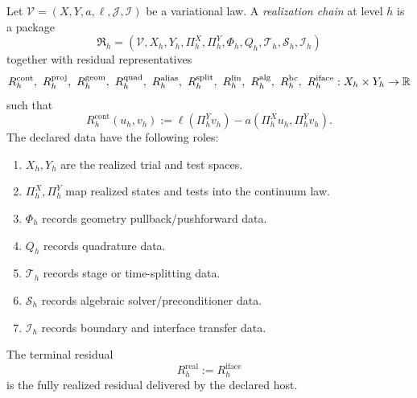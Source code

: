 \begin{definition}
\label{def:realization-chain}
Let \(\mathcal V=(X,Y,a,\ell,\mathcal J,\mathcal I)\) be a variational law. A
\emph{realization chain} at level \(h\) is a package
\[
\mathfrak R_h
=
(\mathcal V,X_h,Y_h,\Pi_h^X,\Pi_h^Y,\Phi_h,Q_h,\mathcal T_h,\mathcal S_h,\mathcal I_h)
\]
together with residual representatives
\[
R_h^{\mathrm{cont}},
\ R_h^{\mathrm{proj}},
\ R_h^{\mathrm{geom}},
\ R_h^{\mathrm{quad}},
\ R_h^{\mathrm{alias}},
\ R_h^{\mathrm{split}},
\ R_h^{\mathrm{lin}},
\ R_h^{\mathrm{alg}},
\ R_h^{\mathrm{bc}},
\ R_h^{\mathrm{iface}}
:X_h\times Y_h\to \mathbb{R}
\]
such that
\[
R_h^{\mathrm{cont}}(u_h,v_h)
:=
\ell(\Pi_h^Y v_h)-a(\Pi_h^X u_h,\Pi_h^Y v_h).
\]
The declared data have the following roles:
\begin{enumerate}[label=(\roman*), leftmargin=2em, itemsep=0.2em]
\item \(X_h,Y_h\) are the realized trial and test spaces.
\item \(\Pi_h^X,\Pi_h^Y\) map realized states and tests into the continuum
      law.
\item \(\Phi_h\) records geometry pullback/pushforward data.
\item \(Q_h\) records quadrature data.
\item \(\mathcal T_h\) records stage or time-splitting data.
\item \(\mathcal S_h\) records algebraic solver/preconditioner data.
\item \(\mathcal I_h\) records boundary and interface transfer data.
\end{enumerate}
The terminal residual
\[
R_h^{\mathrm{real}}:=R_h^{\mathrm{iface}}
\]
is the fully realized residual delivered by the declared host.
\end{definition}

